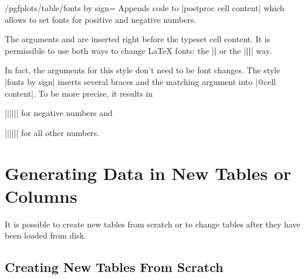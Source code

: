 \documentclass[a4paper]{ltxdoc}
\begin{document}
\begin{stylekey}{/pgfplots/table/fonts by sign=}
    Appends code to |postproc cell content| which allows to set fonts for
    positive and negative numbers.

    The arguments  and  are inserted right before the typeset cell content. It is
    permissible to use both ways to change \LaTeX{} fonts: the
    |\textbf| or the |{\bfseries ||}| way.

\begin{codeexample}[]

%

\end{codeexample}
    In fact, the arguments for this style don't need to be font changes. The
    style |fonts by sign| inserts several braces and the matching argument into
    |@cell content|. To be more precise, it results in

    |{||{||}}| for negative
    numbers and

    |{||{||}}| for all other
    numbers.
\end{stylekey}


\section{Generating Data in New Tables or Columns}
\label{pgfplotstable:createcol}

It is possible to create new tables from scratch or to change tables after they
have been loaded from disk.


\subsection{Creating New Tables From Scratch}
\end{document}
